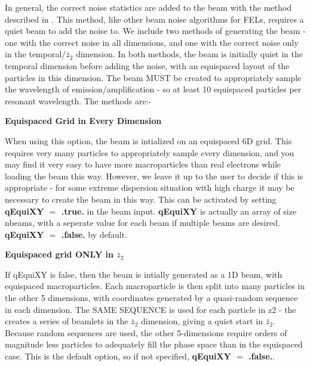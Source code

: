 \documentclass[12pt]{article}%
\begin{document}
In general, the correct noise statistics are added to the beam with the method described in \cite{noise1}. This method, like other beam noise algorithms for FELs, requires a quiet beam to add the noise to. We include two methods of generating the beam - one with the correct noise in all dimensions, and one with the correct noise only in the temporal/$\bar{z}_2$ dimension. In both methods, the beam is initially quiet in the temporal dimension before adding the noise, with an equispaced layout of the particles in this dimension. The beam MUST be created to appropriately sample the wavelength of emission/amplification - so at least 10 equispaced particles per resonant wavelength. The methods are:-




{\bf Equispaced Grid in Every Dimension}

When using this option, the beam is intialized on an equispaced 6D grid. This requires very many particles to appropriately sample every dimension, and you may find it very easy to have more macroparticles than real electrons while loading the beam this way. However, we leave it up to the user to decide if this is appropriate - for some extreme dispersion situation with high charge it may be necessary to create the beam in this way.  This can be activated by setting {\bf qEquiXY $=$ .true.} in the beam input. {\bf qEquiXY} is actually an array of size nbeams, with a seperate value for each beam if multiple beams are desired. {\bf qEquiXY $=$ .false.} by default.

{\bf Equispaced grid ONLY in $\bar{z}_2$}

If qEquiXY is false, then the beam is intially generated as a 1D beam, with equispaced macroparticles. Each macroparticle is then split into many particles in the other 5 dimensions, with coordinates generated by a quasi-random sequence in each dimension. The SAME SEQUENCE is used for each particle in z2 - the creates a series of beamlets in the $\bar{z}_2$ dimension, giving a quiet start in $\bar{z}_2$. Because random sequences are used, the other 5-dimensions require orders of magnitude less particles to adequately fill the phase space than in the equispaced case. This is the default option, so if not specified, {\bf qEquiXY $=$ .false.}.
\end{document}
